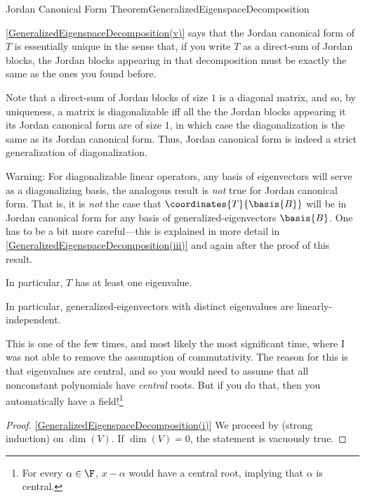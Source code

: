 \begin{thm}{Jordan Canonical Form Theorem}{GeneralizedEigenspaceDecomposition}
\begin{rmk}
		\cref{GeneralizedEigenspaceDecomposition(v)} says that the Jordan canonical form of $T$ is essentially unique in the sense that, if you write $T$ as a direct-sum of Jordan blocks, the Jordan blocks appearing in that decomposition must be exactly the same as the ones you found before.
	\end{rmk}
	\begin{rmk}
		Note that a direct-sum of Jordan blocks of size $1$ is a diagonal matrix, and so, by uniqueness, a matrix is diagonalizable iff all the the Jordan blocks appearing it its Jordan canonical form are of size $1$, in which case the diagonalization is the same as its Jordan canonical form.  Thus, Jordan canonical form is indeed a strict generalization of diagonalization.
	\end{rmk}
	\begin{rmk}
		Warning:  For diagonalizable linear operators, any basis of eigenvectors will serve as a diagonalizing basis, the analogous result is \emph{not} true for Jordan canonical form.  That is, it is \emph{not} the case that $\coordinates{T}{\basis{B}}$ will be in Jordan canonical form for any basis of generalized-eigenvectors $\basis{B}$.  One has to be a bit more careful---this is explained in more detail in \cref{GeneralizedEigenspaceDecomposition(iii)} and again after the proof of this result.
	\end{rmk}
	\begin{rmk}
		In particular, $T$ has at least one eigenvalue.
	\end{rmk}
	\begin{rmk}
		In particular, generalized-eigenvectors with distinct eigenvalues are linearly-independent.
	\end{rmk}
	\begin{rmk}
		This is one of the few times, and most likely the most significant time, where I was not able to remove the assumption of commutativity.  The reason for this is that eigenvalues are central, and so you would need to assume that all nonconstant polynomials have \emph{central} roots.  But if you do that, then you automatically have a field!\footnote{For every $\alpha \in \F$, $x-\alpha$ would have a central root, implying that $\alpha$ is central.}
	\end{rmk}
	\begin{proof}
		\cref{GeneralizedEigenspaceDecomposition(i)} We proceed by (strong induction) on $\dim (V)$.  If $\dim (V)=0$, the statement is vacuously true.
		

\end{proof}
\end{thm}
